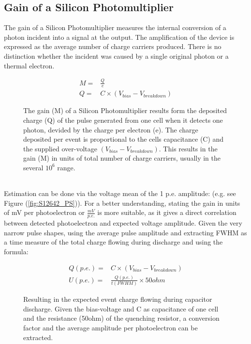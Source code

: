 \documentclass[12pt,article,type=msc,colorback,accentcolor=tud9c]{tudthesis}
\begin{document}
\subsection{Gain of a Silicon Photomultiplier}
\label{subsec:SiPMGain}
The gain of a Silicon Photomultiplier measures the internal conversion of a photon incident into a signal at the output. The amplification of the device is expressed as the average number of charge carriers produced. There is no distinction whether the incident was caused by a single original photon or a thermal electron.
\begin{figure}[h]
\begin{equation}\label{eq:1}
\begin{split}
M = & \frac{Q}{e} \\
Q = &  C \times (V_{bias}-V_{breakdown})
\end{split}
\end{equation}
\label{fig:Gain_conversion_formula}
\caption{The gain (M) of a Silicon Photomultiplier results form the deposited charge (Q) of the pulse generated from one cell when it detects one photon, devided by the charge per electron (e). The charge deposited per event is proportional to the cells capacitance (C) and the supplied over-voltage $(V_{bias}-V_{breakdown})$.\cite{SiPMvsMAPMT} This results in the gain (M) in units of total number of charge carriers, usually in the several $10^6$ range.}
\end{figure}\\
Estimation can be done via the voltage mean of the 1 p.e. amplitude: (e.g. see Figure (\ref{fig:S12642_PS})). For a better understanding, stating the gain in units of mV per photoelectron or $\frac{mV}{p.e.}$ is more suitable, as it gives a direct correlation between detected photoelectron and expected voltage amplitude. Given the very narrow pulse shapes, using the average pulse amplitude and extracting FWHM as a time measure of the total charge flowing during discharge and using the formula:
\begin{figure}[h]
\begin{equation}
\begin{split}
Q(p.e.) = & C \times (V_{bias}-V_{breakdown})\\
U(p.e.) = & \frac{Q(p.e.)}{t(FWHM)} \times 50ohm
\end{split}
\end{equation}
\caption{Resulting in the expected event charge flowing during capacitor discharge. Given the bias-voltage and C as capacitance of one cell and the resistance (50ohm) of the quenching resistor, a conversion factor and the average amplitude per photoelectron can be extracted.}
\end{figure}\\
\end{document}
